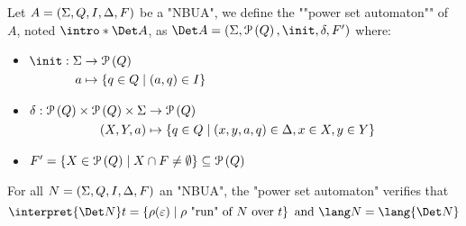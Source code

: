 \documentclass[a4paper,UKenglish,cleveref, autoref, thm-restate]{lipics-v2021}
\begin{document}
\begin{definition}
	\AP Let $A = (\Sigma, Q, I, \Delta, F)$ be a "NBUA", we define the ""power set automaton"" of $A$, noted $\intro* \Det A$, as
	$\Det A = (\Sigma, \parts Q, \init, \delta, F')$ where:

	\begin{itemize}
		\item $\begin{aligned}[t]
				      \init      : \Sigma & \to \parts Q                          \\
				      a                   & \mapsto \setdef{q \in Q}{(a,q) \in I}
			      \end{aligned} $

		\item $\begin{aligned}[t]
				      \delta               : \mathcal{P}\left(Q\right) \times \mathcal{P}\left(Q\right) \times \Sigma & \to \mathcal{P}\left(Q\right)                                                     \\
				      (X, Y, a)                                                     & \mapsto \left\{q \in Q \mid (x,y,a,q) \in \Delta, x \in X, y \in Y\right\}
			      \end{aligned}$

		\item $F' = \left\{X \in \mathcal{P}\left(Q\right) \mid X \cap F \neq \emptyset\right\} \subseteq \mathcal{P}\left(Q\right)$
	\end{itemize}
\end{definition}

\begin{theorem}
	For all $N = (\Sigma, Q, I, \Delta, F)$ an "NBUA", the "power set automaton" verifies that
	\[
		\interpret {\Det N} t = \setdef {\rho(\varepsilon)}{\text{$\rho$ "run" of~$N$ over~$t$}} \text{ and } \lang N = \lang {\Det N}
	\]
\end{theorem}
\end{document}

